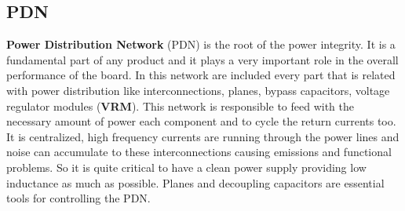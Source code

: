 \documentclass[final]{cubedoc}
\begin{document}
	
	\subsection{PDN}
	
	\textbf{Power Distribution Network} (PDN) is the root of the power integrity. It is a fundamental part of any product and it plays a very important role in the overall performance of the board. In this network are included every part that is related with power distribution like interconnections, planes, bypass capacitors, voltage regulator modules (\textbf{VRM}). This network is responsible to feed with the necessary amount of power each component and to cycle the return currents too. It is centralized, high frequency currents are running through the power lines and noise can accumulate to these interconnections causing emissions and functional problems. So it is quite critical to have a clean power supply providing low inductance as much as possible. Planes and decoupling capacitors are essential tools for controlling the PDN.
	
\end{document}
